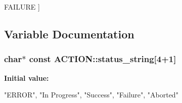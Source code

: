 \begin{Desc}
\begin{description}
{\hypertarget{namespace_a_c_t_i_o_n_a0b229b6d2869056d015d34a33ee7377cab24cb78bd6d115e59df30a6cc2d8169a}{
\-F\-A\-I\-L\-U\-R\-E}
\label{namespace_a_c_t_i_o_n_a0b229b6d2869056d015d34a33ee7377cab24cb78bd6d115e59df30a6cc2d8169a}
}]\item[{\em 
\hypertarget{namespace_a_c_t_i_o_n_a0b229b6d2869056d015d34a33ee7377cac2d5bb521b1ec612627f1f1d68689cbd}{
\-A\-B\-O\-R\-T\-E\-D}
\label{namespace_a_c_t_i_o_n_a0b229b6d2869056d015d34a33ee7377cac2d5bb521b1ec612627f1f1d68689cbd}
}]\end{description}
\end{Desc}



\subsection{\-Variable \-Documentation}
\hypertarget{namespace_a_c_t_i_o_n_ae8af90d024079cba1f31a9517608ce29}{
\subsubsection[{status\-\_\-string}]{\setlength{\rightskip}{0pt plus 5cm}char$\ast$ const {\bf \-A\-C\-T\-I\-O\-N\-::status\-\_\-string}\mbox{[}4+1\mbox{]}}}
\label{namespace_a_c_t_i_o_n_ae8af90d024079cba1f31a9517608ce29}
{\bfseries \-Initial value\-:}
\begin{DoxyCode}

    {   "ERROR", "In Progress", "Success", "Failure", "Aborted" }
\end{DoxyCode}

